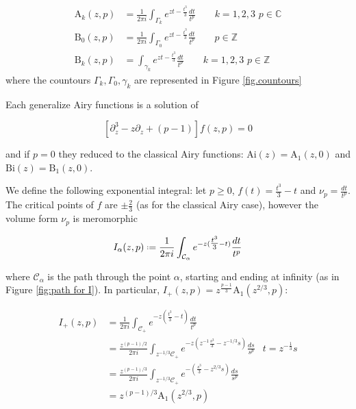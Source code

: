 \documentclass{article}
\newcommand{\Z}{\mathbb{Z}}
\newcommand{\C}{\mathbb{C}}
\newcommand*{\defeq}{\mathrel{\vcenter{\baselineskip0.5ex \lineskiplimit0pt
                     \hbox{\scriptsize.}\hbox{\scriptsize.}}}%
                     =}
\begin{document}
\begin{align*}
\mathrm{A}_k(z,p)&=\frac{1}{2\pi i}\int_{\Gamma_k}e^{zt-\tfrac{t^3}{3}}\frac{dt}{t^p} \qquad k=1,2,3\,\, p\in\C \\
\mathrm{B}_0(z,p)&=\frac{1}{2\pi i}\int_{\Gamma_0}e^{zt-\tfrac{t^3}{3}}\frac{dt}{t^p} \qquad p\in\Z \\
\mathrm{B}_k(z,p)&=\int_{\gamma_k}e^{zt-\tfrac{t^3}{3}}\frac{dt}{t^p} \qquad k=1,2,3\,\, p\in\Z 
\end{align*}
where the countours $\Gamma_k, \Gamma_0, \gamma_k$ are represented in Figure \ref{fig.countours} 

\begin{figure}
\end{figure}

Each generalize Airy functions is a solution of

\begin{equation}
\left[\partial_z^3-z\partial_z+(p-1)\right]f(z,p)=0
\end{equation} 

and if $p=0$ they reduced to the classical Airy functions: $\mathrm{Ai}(z)=\mathrm{A}_1(z,0)$ and $\mathrm{Bi}(z)=\mathrm{B}_1(z,0)$.

We define the following exponential integral: let $p\geq 0$, $f(t)=\tfrac{t^3}{3}-t$ and $\nu_p=\tfrac{dt}{t^p}$. The critical points of $f$ are $\pm\tfrac{2}{3}$ (as for the classical Airy case), however the volume form $\nu_p$ is meromorphic    

\begin{equation}
I_\alpha(z,p)\defeq\frac{1}{2\pi i}\int_{\mathcal{C}_{\alpha}}e^{-z(\tfrac{t^3}{3}-t)}\frac{dt}{t^p}
\end{equation}

where $\mathcal{C}_\alpha$ is the path through the point $\alpha$, starting and ending at infinity (as in Figure \ref{fig:path for I}). In particular, $I_{+}(z,p)=z^{\tfrac{p-1}{3}}\mathrm{A}_1(z^{2/3},p)$: 

\begin{align*}
I_{+}(z,p)&=\frac{1}{2\pi i}\int_{\mathcal{C}_{+}}e^{-z(\tfrac{t^3}{3}-t)}\frac{dt}{t^p} &\\
&=\frac{z^{(p-1)/2}}{2\pi i}\int_{z^{-1/3}\mathcal{C}_{+}}e^{-z(z^{-1}\tfrac{s^3}{3}-z^{-1/3}s)}\frac{ds}{s^p} & t=z^{-\tfrac{1}{3}}s\\
&=\frac{z^{(p-1)/3}}{2\pi i}\int_{z^{-1/3}\mathcal{C}_{+}}e^{-\left(\tfrac{s^3}{3}-z^{2/3}s\right)}\frac{ds}{s^p} & \\
&=z^{(p-1)/3}\mathrm{A}_1(z^{2/3},p)
\end{align*}
\end{document}
